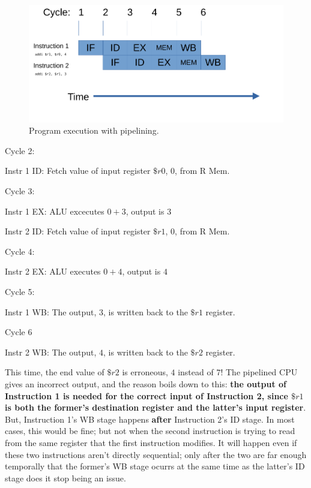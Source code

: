 \documentclass[12pt,twoside]{reedthesis}
\begin{document}
\begin{figure}[h!]

	\centering
	\includegraphics[scale=0.7]{pipeline}
	\caption{Program execution with pipelining.}
	\label{pipeline}
\end{figure}

Cycle 2:

\qquad Instr 1 ID:  Fetch value of input register $\$r0$, $0$, from R Mem.

Cycle 3:

\qquad Instr 1 EX: ALU excecutes $0 + 3$, output is $3$

\qquad Instr 2 ID: Fetch value of input register $\$r1$, $0$, from R Mem.

Cycle 4:

\qquad Instr 2 EX: ALU executes $0 + 4$, output is $4$

Cycle 5:

\qquad Instr 1 WB: The output, $3$, is written back to the $\$r1$ register.

Cycle 6

\qquad Instr 2 WB: The output, $4$, is written back to the $\$r2$ register.

\vspace{5mm}

This time, the end value of $\$r2$ is erroneous, $4$ instead of $7$! The pipelined CPU gives an incorrect output, and the reason boils down to this: \textbf{the output of Instruction 1 is needed for the correct input of Instruction 2, since $\$r1$ is both the former's destination register and the latter's input register}. But, Instruction 1's WB stage happens \textbf{after} Instruction 2's ID stage. In most cases, this would be fine; but not when the second instruction is trying to read from the same register that the first instruction modifies. It will happen even if these two instructions aren't directly sequential; only after the two are far enough temporally that the former's WB stage ocurrs at the same time as the latter's ID stage does it stop being an issue.
\end{document}
